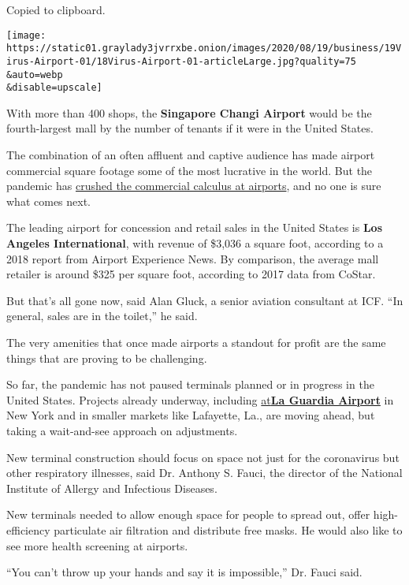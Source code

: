 Copied to clipboard.

\texttt{[image: https://static01.graylady3jvrrxbe.onion/images/2020/08/19/business/19Virus-Airport-01/18Virus-Airport-01-articleLarge.jpg?quality=75\\\&auto=webp\\\&disable=upscale]}

With more than 400 shops, the \textbf{Singapore Changi Airport} would be
the fourth-largest mall by the number of tenants if it were in the
United States.

The combination of an often affluent and captive audience has made
airport commercial square footage some of the most lucrative in the
world. But the pandemic has
\href{https://www.nytimes3xbfgragh.onion/2020/08/18/business/airport-remodeling-coronavirus-safety.html}{crushed
the commercial calculus at airports}, and no one is sure what comes
next.

The leading airport for concession and retail sales in the United States
is \textbf{Los Angeles International}, with revenue of \$3,036 a square
foot, according to a 2018 report from Airport Experience News. By
comparison, the average mall retailer is around \$325 per square foot,
according to 2017 data from CoStar.

But that's all gone now, said Alan Gluck, a senior aviation consultant
at ICF. ``In general, sales are in the toilet,'' he said.

The very amenities that once made airports a standout for profit are the
same things that are proving to be challenging.

So far, the pandemic has not paused terminals planned or in progress in
the United States. Projects already underway, including
\href{https://www.nytimes3xbfgragh.onion/2020/06/10/nyregion/new-la-guardia-airport-terminal.html}{at}\textbf{\href{https://www.nytimes3xbfgragh.onion/2020/06/10/nyregion/new-la-guardia-airport-terminal.html}{La
Guardia Airport}} in New York and in smaller markets like Lafayette,
La., are moving ahead, but taking a wait-and-see approach on
adjustments.

New terminal construction should focus on space not just for the
coronavirus but other respiratory illnesses, said Dr. Anthony S. Fauci,
the director of the National Institute of Allergy and Infectious
Diseases.

New terminals needed to allow enough space for people to spread out,
offer high-efficiency particulate air filtration and distribute free
masks. He would also like to see more health screening at airports.

``You can't throw up your hands and say it is impossible,'' Dr. Fauci
said.

